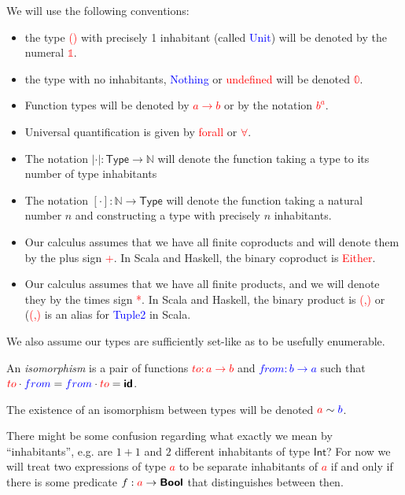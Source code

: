 \documentclass[tikz]{beamer}
\newcommand{\cat}[1]{\bm{ \mathsf{#1} }}
\newcommand{\zero}{\bm{\mathbb{0}}}
\newcommand{\one}{\bm{\mathbb{1}}}
\newcommand{\red}[1]{\textcolor{red}{#1}}
\newcommand{\mred}[1]{\textcolor{red}{$#1$}}
\newcommand{\blue}[1]{\textcolor{blue}{#1}}
\newcommand{\mblue}[1]{\textcolor{blue}{$#1$}}
\theoremstyle{definition}
\begin{document}
\frame
{ 
	We will use the following conventions: 
	
	\begin{itemize}
		\item the type \red{()} with precisely 1 inhabitant (called \blue{Unit}) will be denoted by the numeral  \mred{\one}. 
		\item the type with no inhabitants, \blue{Nothing} or \red{undefined} will be denoted \mred{\zero}. 
		\item Function types will be denoted by \red{$a \to b$} or by the notation \red{$b^a$}. 
		\item Universal quantification is given by \red{forall} or \red{$\forall$}.
		\item The notation $|\cdot| : \cat{Type} \to \mathbb{N}$ will denote the function taking a type to its number of type inhabitants
		\item The notation $[\cdot] : \mathbb{N} \to \cat{Type} $ will denote the function taking a natural number $n$ and constructing a type with precisely $n$ inhabitants. 
	\end{itemize}
}

\frame
{
	\begin{itemize}
		\item Our calculus assumes that we have all finite coproducts and will denote them by the plus sign \red{+}. In Scala and Haskell, the binary coproduct is \red{Either}.
		\item Our calculus assumes that we have all finite products, and we will denote they by the times sign \red{*}. In Scala and Haskell, the binary product is \red{(,)} or (\red{(,)} is an alias for \blue{Tuple2} in Scala.
	\end{itemize}
}


\frame
{
	We also assume our types are sufficiently set-like as to be usefully enumerable. 
}

\frame
{
	
	\begin{definition}[Isomorphism]
	
		An \textit{isomorphism} is a pair of functions \mred{to : a \to b} and \mblue{from : b \to a} such that $\red{to} \cdot \blue{from} = \blue{from} \cdot \red{to} = \cat{id}$. 
		
		The existence of an isomorphism between types will be denoted $\red{a}  \sim \blue{b}$. 
		
	\end{definition}
}


\frame
{
	There might be some confusion regarding what exactly we mean by “inhabitants”, e.g. are $1 + 1$ and $2$ different inhabitants of type $\cat{Int}$? For now we will treat two expressions of type \mred{a} to be separate inhabitants of \mred{a} if and only if there is some predicate $f : \red{a} \to \cat{Bool}$ that distinguishes between then. 
}
\end{document}
